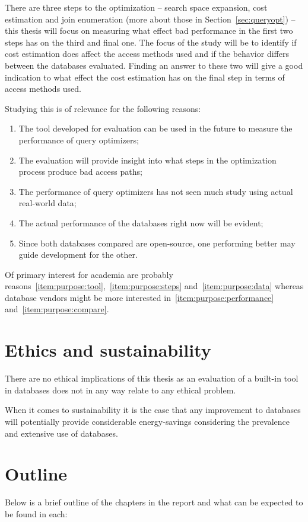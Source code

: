 There are three steps to the optimization – search space expansion, cost
estimation and join enumeration (more about those in Section~\ref{sec:queryopt})
– this thesis will focus on measuring what effect bad performance in the first
two steps has on the third and final one. The focus of the study will be to
identify if cost estimation does affect the access methods used and if the
behavior differs between the databases evaluated. Finding an answer to these two
will give a good indication to what effect the cost estimation has on the final
step in terms of access methods used.

Studying this is of relevance for the following reasons:
\begin{enumerate}
\item\label{item:purpose:tool} The tool developed for evaluation can be used
  in the future to measure the performance of query optimizers;
\item\label{item:purpose:steps} The evaluation will provide insight into
  what steps in the optimization process produce bad access paths;
\item\label{item:purpose:data} The performance of query optimizers has not
  seen much study using actual real-world data;
\item\label{item:purpose:performance} The actual performance of the
  databases right now will be evident;
\item\label{item:purpose:compare} Since both databases compared are
  open-source, one performing better may guide development for the other.
\end{enumerate}

Of primary interest for academia are probably
reasons~\ref{item:purpose:tool},~\ref{item:purpose:steps}
and~\ref{item:purpose:data} whereas database vendors might be more interested
in~\ref{item:purpose:performance} and~\ref{item:purpose:compare}.

\section{Ethics and sustainability}
There are no ethical implications of this thesis as an evaluation of a built-in
tool in databases does not in any way relate to any ethical problem.

When it comes to sustainability it is the case that any improvement to databases
will potentially provide considerable energy-savings considering the prevalence
and extensive use of databases.

\section{Outline}
Below is a brief outline of the chapters in the report and what can be expected
to be found in each:


